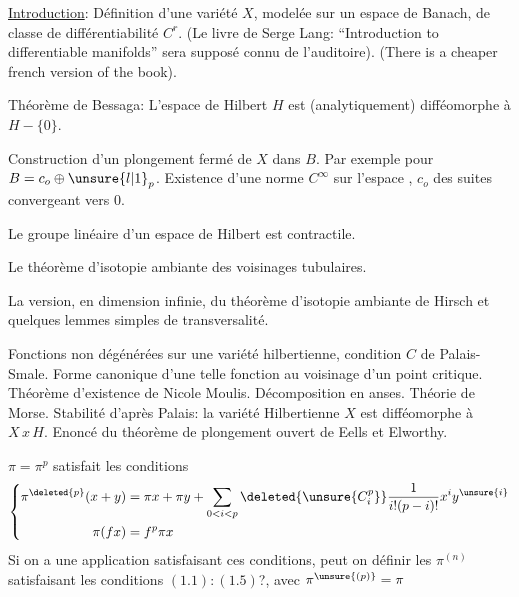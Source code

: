 \uline{Introduction}: Définition d'une variété $X$, modelée sur un espace de Banach, de classe de différentiabilité $C^r$. (Le livre de Serge Lang: ``Introduction to differentiable manifolds'' sera supposé connu de l'auditoire). (There is a cheaper french version of the book).

Théorème de Bessaga: L'espace de Hilbert $H$ est (analytiquement) difféomorphe à $H-\{0\}$.

Construction d'un plongement fermé de $X$ dans $B$. Par exemple pour $B=c_o\oplus\unsure{l|1}_p$. Existence d'une norme $C^\infty$ sur l'espace , $c_o$ des suites convergeant vers $0$.

Le groupe linéaire d'un espace de Hilbert est contractile.

Le théorème d'isotopie ambiante des voisinages tubulaires.

La version, en dimension infinie, du théorème d'isotopie ambiante de Hirsch et quelques lemmes simples de transversalité.

Fonctions non dégénérées sur une variété hilbertienne, condition $C$ de Palais-Smale. Forme canonique d'une telle fonction au voisinage d'un point critique. Théorème d'existence de Nicole Moulis. Décomposition en anses. Théorie de Morse. Stabilité d'après Palais: la variété Hilbertienne $X$ est difféomorphe à $X\,x\,H$. Enoncé du théorème de plongement ouvert de Eells et Elworthy.

\margin{$\ldots/$}


$\pi=\pi^p$ satisfait les conditions
\[
\left\{\begin{aligned}
\pi^{\deleted{p}}(x+y)&=\pi x+\pi y+\sum_{0<i<p}\deleted{\unsure{C_i^p}}\frac{1}{i!(p-i)!}x^iy^{\unsure{i}}\\
\pi(fx)&=f^p\pi x
\end{aligned}\right.
\]
Si on a une application satisfaisant ces conditions, peut on définir les $\pi^{(n)}$  satisfaisant les conditions   $(1.1):(1.5)$?, avec $\pi^{\unsure{(p)}}=\pi$


